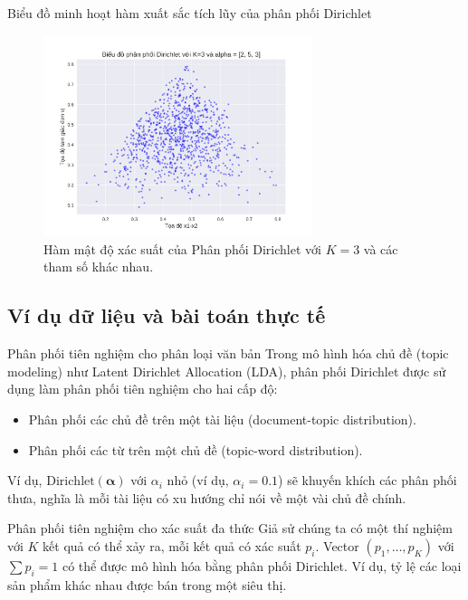 	Biểu đồ minh hoạt hàm xuất sắc tích lũy của phân phối Dirichlet
	
	\begin{figure}[h!]
		\centering
		\includegraphics[width=0.7\textwidth]{images/Dirichlet Distribution-CDF.png} %
		\caption{Hàm mật độ xác suất của Phân phối Dirichlet với $K=3$ và các tham số khác nhau.}
		\label{fig:pngDirichlet Distribution-CDF}
	\end{figure}
	
	\subsection{Ví dụ dữ liệu và bài toán thực tế}
		Phân phối tiên nghiệm cho phân loại văn bản
		Trong mô hình hóa chủ đề (topic modeling) như Latent Dirichlet Allocation (LDA), 
		phân phối Dirichlet được sử dụng làm phân phối tiên nghiệm cho hai cấp độ:
		\begin{itemize}
			\item Phân phối các chủ đề trên một tài liệu (document-topic distribution).
			\item Phân phối các từ trên một chủ đề (topic-word distribution).
		\end{itemize}
		Ví dụ, $\text{Dirichlet}(\boldsymbol{\alpha})$ với $\alpha_i$ nhỏ (ví dụ, $\alpha_i=0.1$) sẽ khuyến khích các phân phối thưa, nghĩa là mỗi tài liệu có xu hướng chỉ nói về một vài chủ đề chính.
	
		Phân phối tiên nghiệm cho xác suất đa thức
		Giả sử chúng ta có một thí nghiệm với $K$ kết quả có thể xảy ra, mỗi kết quả có xác suất $p_i$. Vector $(p_1, \dots, p_K)$ với $\sum p_i = 1$ có thể được mô hình hóa bằng phân phối Dirichlet. Ví dụ, tỷ lệ các loại sản phẩm khác nhau được bán trong một siêu thị.
